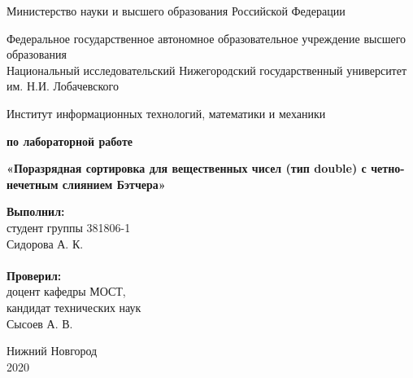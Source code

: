 \documentclass{report}
\begin{document}
\begin{titlepage}

\begin{center}
Министерство науки и высшего образования Российской Федерации
\end{center}

\begin{center}
Федеральное государственное автономное образовательное учреждение высшего образования \\
Национальный исследовательский Нижегородский государственный университет им. Н.И. Лобачевского
\end{center}

\begin{center}
Институт информационных технологий, математики и механики
\end{center}

\vspace{4em}

\begin{center}
\textbf{ по лабораторной работе} \\
\end{center}
\begin{center}
\textbf{\Large«Поразрядная сортировка для вещественных чисел (тип double) с четно-нечетным слиянием Бэтчера»} \\
\end{center}

\vspace{4em}

\newbox{\lbox}
\newlength{\maxl}
\setlength{\maxl}{\wd\lbox}
\hfill\parbox{7cm}{
\hspace*{5cm}\hspace*{-5cm}\textbf{Выполнил:} \\ студент группы 381806-1 \\ Сидорова А. К.\\
\\
\hspace*{5cm}\hspace*{-5cm}\textbf{Проверил:}\\ доцент кафедры МОСТ, \\ кандидат технических наук \\ Сысоев А. В.\\
}
\vspace{\fill}

\begin{center} Нижний Новгород \\ 2020 \end{center}

\end{titlepage}
\end{document}
